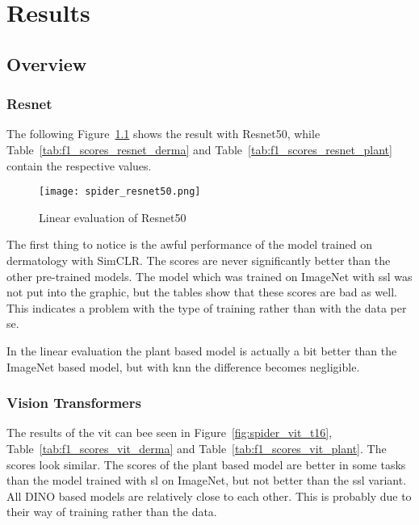 \chapter{Results}

\section{Overview}
\subsection{Resnet}

The following Figure~\ref{fig:spider_resnet50} shows the result with Resnet50, while Table~\ref{tab:f1_scores_resnet_derma} and Table~\ref{tab:f1_scores_resnet_plant} contain the respective values.
\begin{figure}[H]
    \begin{center}
    \texttt{[image: spider\_resnet50.png]}
    \caption{Linear evaluation of Resnet50}\label{fig:spider_resnet50}
    \end{center}
\end{figure}

The first thing to notice is the awful performance of the model trained on dermatology with SimCLR. The scores are never significantly better than the other pre-trained models. The model which was trained on ImageNet with \gls{ssl} was not put into the graphic, but the tables show that these scores are bad as well. 
This indicates a problem with the type of training rather than with the data per se.

In the linear evaluation the plant based model is actually a bit better than the ImageNet based model, but with \gls{knn} the difference becomes negligible.



\subsection{Vision Transformers}

The results of the \gls{vit} can bee seen in Figure~\ref{fig:spider_vit_t16}, Table~\ref{tab:f1_scores_vit_derma} and Table~\ref{tab:f1_scores_vit_plant}. 
The scores look similar. The scores of the plant based model are better in some tasks than the model trained with \gls{sl} on ImageNet, but not better than the \gls{ssl} variant. All DINO based models are relatively close to each other. This is probably due to their way of training rather than the data.

